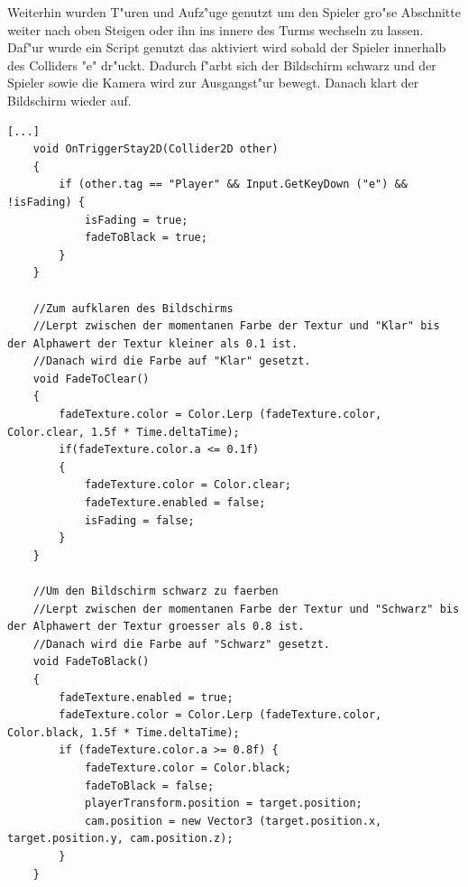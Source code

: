Weiterhin wurden T"uren und Aufz"uge genutzt um den Spieler gro"se Abschnitte weiter nach oben Steigen oder ihn ins innere des Turms wechseln zu lassen. Daf"ur wurde ein Script genutzt das aktiviert wird sobald der Spieler innerhalb des Colliders "e" dr"uckt. Dadurch f"arbt sich der Bildschirm schwarz und der Spieler sowie die Kamera wird zur Ausgangst"ur bewegt. Danach klart der Bildschirm wieder auf.

\begin{lstlisting}[breaklines=true]
	[...]
	void OnTriggerStay2D(Collider2D other)
	{
		if (other.tag == "Player" && Input.GetKeyDown ("e") && !isFading) {
			isFading = true;
			fadeToBlack = true;
		}
	}
	
	//Zum aufklaren des Bildschirms
	//Lerpt zwischen der momentanen Farbe der Textur und "Klar" bis der Alphawert der Textur kleiner als 0.1 ist.
	//Danach wird die Farbe auf "Klar" gesetzt.
	void FadeToClear()
	{ 
		fadeTexture.color = Color.Lerp (fadeTexture.color, Color.clear, 1.5f * Time.deltaTime);
		if(fadeTexture.color.a <= 0.1f)
		{
			fadeTexture.color = Color.clear;
			fadeTexture.enabled = false;
			isFading = false;
		}
	}
	
	//Um den Bildschirm schwarz zu faerben
	//Lerpt zwischen der momentanen Farbe der Textur und "Schwarz" bis der Alphawert der Textur groesser als 0.8 ist.
	//Danach wird die Farbe auf "Schwarz" gesetzt.
	void FadeToBlack()
	{
		fadeTexture.enabled = true;
		fadeTexture.color = Color.Lerp (fadeTexture.color, Color.black, 1.5f * Time.deltaTime);
		if (fadeTexture.color.a >= 0.8f) {
			fadeTexture.color = Color.black;
			fadeToBlack = false;
			playerTransform.position = target.position;
			cam.position = new Vector3 (target.position.x, target.position.y, cam.position.z);
		}
	}
\end{lstlisting}